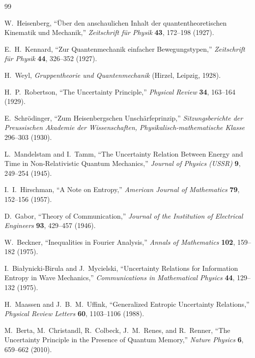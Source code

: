 \documentclass[11pt]{article}
\theoremstyle{plain}
\theoremstyle{definition}
\theoremstyle{remark}
\begin{document}
\begin{thebibliography}{99}

W.~Heisenberg, ``\"Uber den anschaulichen Inhalt der quantentheoretischen Kinematik und Mechanik,''
\emph{Zeitschrift f\"ur Physik} \textbf{43}, 172--198 (1927).

E.~H.~Kennard, ``Zur Quantenmechanik einfacher Bewegungstypen,''
\emph{Zeitschrift f\"ur Physik} \textbf{44}, 326--352 (1927).

H.~Weyl, \emph{Gruppentheorie und Quantenmechanik} (Hirzel, Leipzig, 1928).

H.~P.~Robertson, ``The Uncertainty Principle,'' \emph{Physical Review} \textbf{34}, 163--164 (1929).

E.~Schr\"odinger, ``Zum Heisenbergschen Unsch\"arfeprinzip,''
\emph{Sitzungsberichte der Preussischen Akademie der Wissenschaften, Physikalisch-mathematische
Klasse} 296--303 (1930).

L.~Mandelstam and I.~Tamm, ``The Uncertainty Relation Between Energy and Time in Non-Relativistic
Quantum Mechanics,'' \emph{Journal of Physics (USSR)} \textbf{9}, 249--254 (1945).

I.~I.~Hirschman, ``A Note on Entropy,'' \emph{American Journal of Mathematics} \textbf{79},
152--156 (1957).

D.~Gabor, ``Theory of Communication,'' \emph{Journal of the Institution of Electrical Engineers}
\textbf{93}, 429--457 (1946).

W.~Beckner, ``Inequalities in Fourier Analysis,'' \emph{Annals of Mathematics} \textbf{102},
159--182 (1975).

I.~Bia\l ynicki-Birula and J.~Mycielski, ``Uncertainty Relations for Information Entropy in Wave
Mechanics,'' \emph{Communications in Mathematical Physics} \textbf{44}, 129--132 (1975).

H.~Maassen and J.~B.~M.~Uffink, ``Generalized Entropic Uncertainty Relations,''
\emph{Physical Review Letters} \textbf{60}, 1103--1106 (1988).

M.~Berta, M.~Christandl, R.~Colbeck, J.~M.~Renes, and R.~Renner, ``The Uncertainty Principle in the
Presence of Quantum Memory,'' \emph{Nature Physics} \textbf{6}, 659--662 (2010).

\end{thebibliography}
\end{document}
